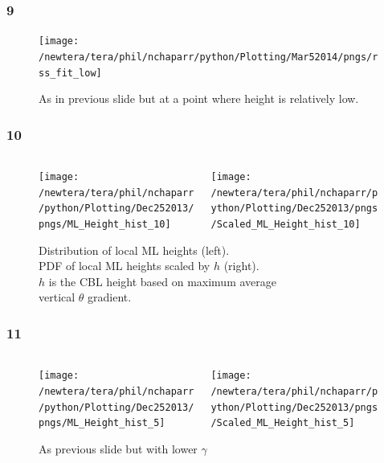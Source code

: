 \documentclass{beamer}
\newcommand\FrameText[1]{
\begin{textblock}{16}(1,2.5)
\raggedright #1
\end{textblock}}
\begin{document}
\begin{frame}
\frametitle{9}

\begin{figure}
\fontsize{12pt}{7.2}\selectfont
\centering
\texttt{[image: /newtera/tera/phil/nchaparr/python/Plotting/Mar52014/pngs/rss\_fit\_low]}
\caption{As in previous slide but at a point where height is relatively low.}
\end{figure}
\end{frame}

\begin{frame}
\frametitle{10}
\fontsize{12pt}{7.2}\selectfont
\begin{figure}
\begin{columns}[T]
   \begin{column}{.5\textwidth}
   \centering
   \texttt{[image: /newtera/tera/phil/nchaparr/python/Plotting/Dec252013/pngs/ML\_Height\_hist\_10]} 
   \end{column} 
   
   \begin{column}{.5\textwidth}
    \centering
    \texttt{[image: /newtera/tera/phil/nchaparr/python/Plotting/Dec252013/pngs/Scaled\_ML\_Height\_hist\_10]}
   \end{column}     
\end{columns}
\caption{Distribution of local ML heights (left).\\
PDF of local ML heights scaled by $h$ (right).\\
$h$ is the CBL height based on maximum average\\
 vertical $\theta$ gradient.}
\end{figure}
\end{frame}

\begin{frame}
\frametitle{11}
\fontsize{12pt}{7.2}\selectfont
\begin{figure}
\begin{columns}[T]
   \begin{column}{.5\textwidth}
   \texttt{[image: /newtera/tera/phil/nchaparr/python/Plotting/Dec252013/pngs/ML\_Height\_hist\_5]} 
   \end{column} 
   
   \begin{column}{.5\textwidth}
    \texttt{[image: /newtera/tera/phil/nchaparr/python/Plotting/Dec252013/pngs/Scaled\_ML\_Height\_hist\_5]}
   \end{column}     
\end{columns}
\caption{As previous slide but with lower $\gamma$}
\end{figure}
\end{frame}
\end{document}

